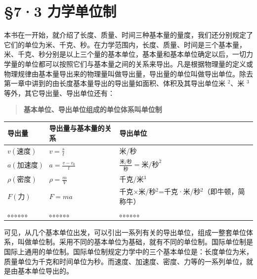 \section{§7·3 力学单位制}\label{ux529bux5b66ux5355ux4f4dux5236}

本书在一开始，就介绍了长度、质量、时间三种基本量的量度，我们还分别规定了它们的单位为米、千克、秒。在力学范围内，长度、质量、时间是三个基本量，米、千克、秒分别是以上三个量的基本单位，基本量和基本单位确定以后，一切力学量的单位都可以按照它们与基本量之间的关系来导出。凡是根据物理量的定义或物理规律由基本量导出来的物理量叫做导出量，导出量的单位叫做导出单位。除去第一章中讲到的由长度基本量导出的导出量如面积、体积及其导出单位米
\(^{2}\)、米 \(^{3}\) 等外，其它导出量、导出单位还有：

\begin{quote}
\textbf{基本单位、导出单位组成的单位体系叫单位制}
\end{quote}

{\def\LTcaptype{none} %
\begin{longtable}[]{@{}
  >{\raggedright\arraybackslash}p{}
  >{\raggedright\arraybackslash}p{}
  >{\raggedright\arraybackslash}p{}@{}}
\toprule\noalign{}
\begin{minipage}[b]{\linewidth}\raggedright
导出量
\end{minipage} & \begin{minipage}[b]{\linewidth}\raggedright
导出量与基本量的关系
\end{minipage} & \begin{minipage}[b]{\linewidth}\raggedright
导出单位
\end{minipage} \\
\midrule\noalign{}
\endhead
\bottomrule\noalign{}
\endlastfoot
\(v(\text{速度})\) & \(v=\frac{s}{t}\) & 米/秒 \\
\(a(\text{加速度})\) & \(a=\frac{v-v_{0}}{t}\) &
\(\frac{\text{米/秒}}{\text{秒}}=\text{米/秒}^{2}\) \\
\(\rho(\text{密度})\) & \(\rho=\frac{m}{V}\) & 千克/米\(^{3}\) \\
\(F(\text{力})\) & \(F=ma\) &
千克×米/秒\(^{2}\)=千克·米/秒\(^{2}\)（即牛顿，简称牛） \\
。。。。。。 & 。。。。。。 & 。。。。。。 \\
\end{longtable}
}

可见，从几个基本单位出发，可以引出一系列有关的导出单位，组成一整套单位体系，叫做单位制。采用不同的基本单位为基础，就有不同的单位制。国际单位制是国际上通用的单位制。国际单位制规定力学中的三个基本单位是：长度单位为米，质量单位为千克和时间单位为秒。而速度、加速度、密度、力等的一系列单位，就是由基本单位导出的。

